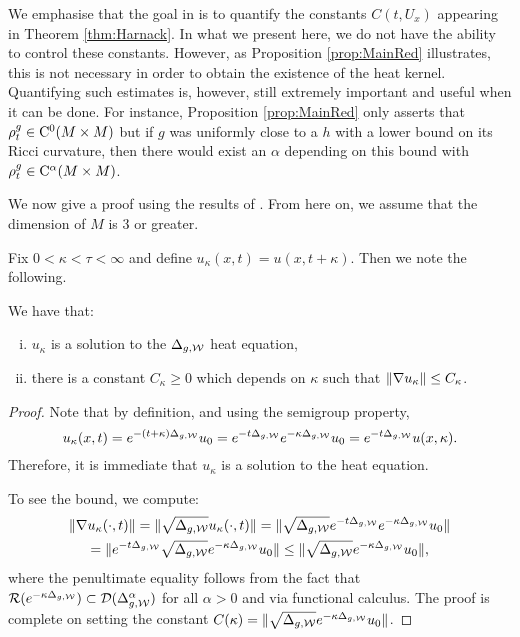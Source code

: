 \documentclass[a4paper, 12pt]{amsart}
\begin{document}
We emphasise that the goal in \cite{SC}
is to quantify the constants $C(t,U_x)$
appearing in Theorem \ref{thm:Harnack}. In what we present here, we do not have
the ability to control these constants. However, as
Proposition \ref{prop:MainRed} illustrates, this is not necessary 
in order to obtain the existence of the heat kernel.
Quantifying such estimates is, however, still 
extremely important and useful when it can be done.
For instance, Proposition \ref{prop:MainRed} 
only asserts that $\rho^{g}_t \in {\rm C}^{0}_{\rm {}}(M \times M)$
but if $g$ was uniformly close to a $h$
with a lower bound on its Ricci curvature, then
there would exist an $\alpha$ depending on this bound
with $\rho^{g}_t \in {\rm C}^{\alpha}_{\rm {}}(M \times M)$.

We now give a proof using the results of \cite{CS}.
From here on, we assume that the dimension of $M$ is $3$ or greater. 

Fix $0 < \kappa < \tau < \infty$ and 
define $u_\kappa(x,t) = u(x,t+\kappa)$. Then we note the following. 
\begin{lemma}
\label{lem:shiftsol}
We have that: 
\begin{enumerate}[(i)] 
\item $u_\kappa$ is a solution to the $\Delta_{g,\mathcal{W}}$ heat equation, 
\item there is a constant $C_\kappa \geq 0$
	which depends on $\kappa$ 
	such that $\| \nabla u_\kappa \| \leq C_\kappa$.
\end{enumerate} 
\end{lemma}
\begin{proof}
Note that by definition, and using the semigroup property, 
$$u_\kappa(x,t) = e^{-(t + \kappa)\Delta_{g,\mathcal{W}}} u_0 
	=e^{-t \Delta_{g,\mathcal{W}}}e^{-\kappa\Delta_{g,\mathcal{W}}}u_0
	=e^{-t \Delta_{g,\mathcal{W}}}u(x,\kappa).$$ 
Therefore, it is immediate that $u_\kappa$ is a solution
to the heat equation. 

To see the bound, we compute: 
\begin{multline*} 
\|  \nabla u_\kappa(\cdot, t) \| 
	= \|  \sqrt{\Delta_{g,\mathcal{W}}} u_\kappa(\cdot, t) \| 
	= \|  \sqrt{\Delta_{g,\mathcal{W}}} e^{-t\Delta_{g,\mathcal{W}}} e^{-\kappa \Delta_{g,\mathcal{W}}}u_0 \| \\
	= \|  e^{-t \Delta_{g,\mathcal{W}}} \sqrt{ \Delta_{g,\mathcal{W}}} e^{-\kappa \Delta_{g,\mathcal{W}}}u_0 \|
	\leq \| \sqrt{ \Delta_{g,\mathcal{W}}} e^{-\kappa \Delta_{g,\mathcal{W}}}u_0 \|,
\end{multline*}
where the penultimate equality follows from the fact that
${\mathcal{R}}(e^{-\kappa \Delta_{g,\mathcal{W}}}) \subset {\mathcal{D}}(\Delta_{g,\mathcal{W}}^\alpha)$
for all $\alpha > 0$ and via functional calculus.
The proof is complete on setting the constant 
$C(\kappa) = \| \sqrt{ \Delta_{g,\mathcal{W}}} e^{-\kappa \Delta_{g,\mathcal{W}}}u_0 \|$.
\end{proof}
\end{document}

